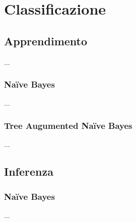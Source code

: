 
\chapter{Classificazione}
\label{cap:ctbnc}
\lipsum[1]

\section{Apprendimento}
...

\subsection{Na\"ive Bayes}
...

\subsection{Tree Augumented Na\"ive Bayes}
...

\section{Inferenza}
\lipsum[4]

\subsection{Na\"ive Bayes}
...
